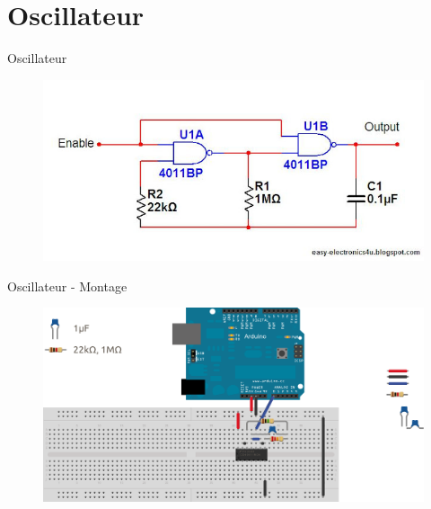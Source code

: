 \documentclass[handout]{beamer}
\begin{document}
\section{Oscillateur}
\begin{frame}{Oscillateur}
	\begin{figure}
		\centering
		\includegraphics[width=\textwidth,height=0.9\textheight,keepaspectratio]{oscillator.jpg}
	\end{figure}
\end{frame}

\begin{frame}{Oscillateur - Montage}
	\begin{figure}
		\centering
		\includegraphics[width=\textwidth,height=0.9\textheight,keepaspectratio]{sysdig_clock}
	\end{figure}
\end{frame}
\end{document}
